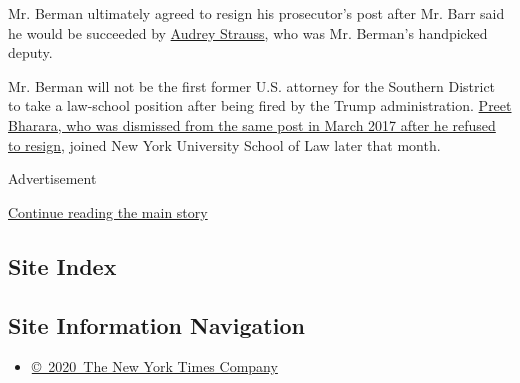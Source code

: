 Mr. Berman ultimately agreed to resign his prosecutor's post after Mr.
Barr said he would be succeeded by
\href{https://www.nytimes3xbfgragh.onion/2020/06/21/nyregion/us-attorney-trump-audrey-strauss.html}{Audrey
Strauss}, who was Mr. Berman's handpicked deputy.

Mr. Berman will not be the first former U.S. attorney for the Southern
District to take a law-school position after being fired by the Trump
administration.
\href{https://www.nytimes3xbfgragh.onion/2017/03/21/nyregion/preet-bharara-nyu-law-school.html}{Preet
Bharara, who was dismissed from the same post in March 2017 after he
refused to resign}, joined New York University School of Law later that
month.

Advertisement

\protect\hyperlink{after-bottom}{Continue reading the main story}

\hypertarget{site-index}{%
\subsection{Site Index}\label{site-index}}

\hypertarget{site-information-navigation}{%
\subsection{Site Information
Navigation}\label{site-information-navigation}}

\begin{itemize}
\tightlist
\item
  \href{https://help.nytimes3xbfgragh.onion/hc/en-us/articles/115014792127-Copyright-notice}{©~2020~The
  New York Times Company}
\end{itemize}


